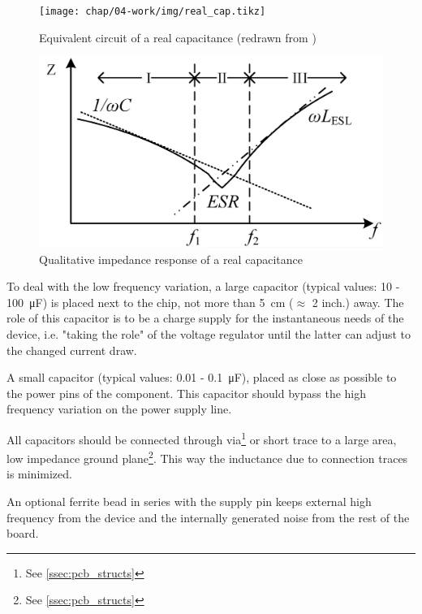 \tikzexternaldisable
\begin{figure}[tbh]
	\centering
	\texttt{[image: chap/04-work/img/real\_cap.tikz]}
	\caption[Capacitor equivalent circuit]{Equivalent circuit of a real capacitance (redrawn from \cite{decouple})}
	\label{fig:real_cap}
\end{figure}
\tikzexternalenable
\begin{figure}[tbh]
	\centering
	\includegraphics[width = \textwidth]{chap/04-work/img/esl_esr}
	\caption[Impedance response of a real capacitor]{Qualitative impedance response of a real capacitance \cite{Dang2020}}
	\label{fig:esl_esr}
\end{figure}


To deal with the low frequency variation, a large capacitor (typical values: 10 - \SI{100}{\micro \farad}) is placed next to the chip, not more than \SI{5}{\centi \metre} ($\approx$ 2 inch.) away. The role of this capacitor is to be a charge supply for the instantaneous needs of the device, i.e. "taking the role" of the voltage regulator until the latter can adjust to the changed current draw. \cite{decouple}

A small capacitor (typical values: 0.01 - \SI{0.1}{\micro \farad}), placed as close as possible to the power pins of the component. This capacitor should bypass the high frequency variation on the power supply line. \cite{decouple}

All capacitors should be connected through via\footnote{See \autoref{ssec:pcb_structs}} or short trace to a large area, low impedance ground plane\footnote{See \autoref{ssec:pcb_structs}}. This way the inductance due to connection traces is minimized. \cite{decouple}

An optional ferrite bead in series with the supply pin keeps external high frequency from the device and the internally generated noise from the rest of the board. \cite{decouple}

